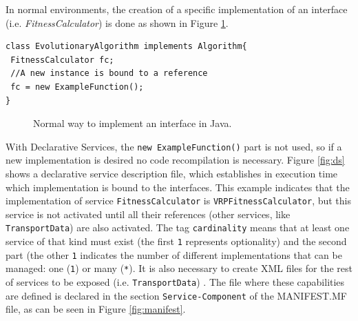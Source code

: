 In normal environments, the creation of a specific implementation of an interface (i.e. {\em FitnessCalculator}) is done as shown in Figure \ref{fig:normalImp}.

\newsavebox{\mintedboxOSGIinst}
\begin{lrbox}{\mintedboxOSGIinst}
\begin{minipage}{10cm}
\begin{verbatim}
class EvolutionaryAlgorithm implements Algorithm{
 FitnessCalculator fc;
 //A new instance is bound to a reference
 fc = new ExampleFunction();
}
\end{verbatim}
\end{minipage}
\end{lrbox}

\begin{figure}
\usebox{\mintedboxOSGIinst}
\caption{Normal way to implement an interface in Java.} 
\label{fig:normalImp} 
\end{figure}


With Declarative Services, the \texttt{new ExampleFunction()} part is not used, so if a new implementation is desired no code recompilation is necessary.  Figure \ref{fig:ds} shows a declarative service description file, which establishes in execution time which implementation is bound to the interfaces. This example indicates that the implementation of service \texttt{FitnessCalculator} is \texttt{VRP\-Fit\-ness\-Cal\-cu\-la\-tor}, but this service is not activated until all their references (other services, like \texttt{TransportData}) are also activated. The tag \texttt{cardinality} means that at least one service of that kind must exist (the first \texttt{1} represents optionality) and  the second part (the other \texttt{1} indicates the number of different implementations that can be managed: one (\texttt{1}) or many (\texttt{*}). It is also necessary to create XML files for the rest of services to be exposed (i.e. \texttt{TransportData}) . The file where these capabilities are defined is declared in the section \texttt{Service-Component} of the MANIFEST.MF file, as can be seen in Figure \ref{fig:manifest}.



